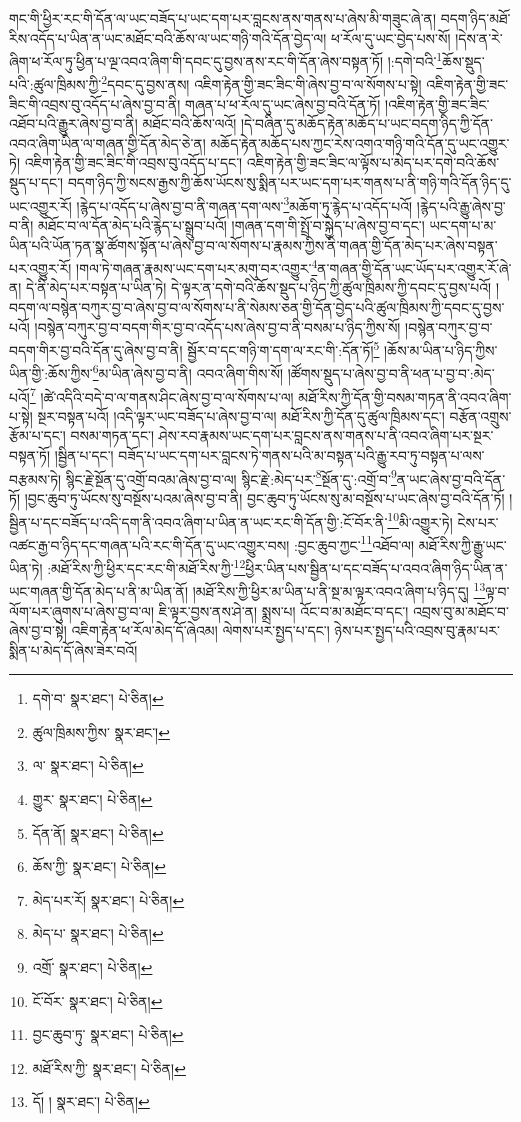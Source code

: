 གང་གི་ཕྱིར་རང་གི་དོན་ལ་ཡང་བཟོད་པ་ཡང་དག་པར་བླངས་ནས་གནས་པ་ཞེས་མི་གཟུང་ཞེ་ན། བདག་ཉིད་མཐོ་རིས་འདོད་པ་ཡིན་ན་ཡང་མཐོང་བའི་ཆོས་ལ་ཡང་གཉི་གའི་དོན་བྱེད་ལ། ཕ་རོལ་དུ་ཡང་བྱེད་པས་སོ། །དེས་ན་རེ་ཞིག་ཕ་རོལ་ཏུ་ཕྱིན་པ་ལྔ་འབའ་ཞིག་གི་དབང་དུ་བྱས་ནས་རང་གི་དོན་ཞེས་བསྟན་ཏོ། །:དགེ་བའི་\footnote{དགེ་བ་  སྣར་ཐང་།  པེ་ཅིན། }ཆོས་སྡུད་པའི་:ཚུལ་ཁྲིམས་ཀྱི་\footnote{ཚུལ་ཁྲིམས་ཀྱིས་  སྣར་ཐང་། }དབང་དུ་བྱས་ནས། འཇིག་རྟེན་གྱི་ཟང་ཟིང་གི་ཞེས་བྱ་བ་ལ་སོགས་པ་སྟེ། འཇིག་རྟེན་གྱི་ཟང་ཟིང་གི་འབྲས་བུ་འདོད་པ་ཞེས་བྱ་བ་ནི། གཞན་པ་ཕ་རོལ་དུ་ཡང་ཞེས་བྱ་བའི་དོན་ཏོ། །འཇིག་རྟེན་གྱི་ཟང་ཟིང་འཐོབ་པའི་རྒྱུར་ཞེས་བྱ་བ་ནི། མཐོང་བའི་ཆོས་ལའོ། །དེ་བཞིན་དུ་མཆོད་རྟེན་མཆོད་པ་ཡང་བདག་ཉིད་ཀྱི་དོན་འབའ་ཞིག་ཡིན་ལ་གཞན་གྱི་དོན་མེད་ཅེ་ན། མཆོད་རྟེན་མཆོད་པས་ཀྱང་རེས་འགའ་གཉི་གའི་དོན་དུ་ཡང་འགྱུར་ཏེ། འཇིག་རྟེན་གྱི་ཟང་ཟིང་གི་འབྲས་བུ་འདོད་པ་དང་། འཇིག་རྟེན་གྱི་ཟང་ཟིང་ལ་ལྟོས་པ་མེད་པར་དགེ་བའི་ཆོས་སྡུད་པ་དང་། བདག་ཉིད་ཀྱི་སངས་རྒྱས་ཀྱི་ཆོས་ཡོངས་སུ་སྨིན་པར་ཡང་དག་པར་གནས་པ་ནི་གཉི་གའི་དོན་ཉིད་དུ་ཡང་འགྱུར་རོ། །རྙེད་པ་འདོད་པ་ཞེས་བྱ་བ་ནི་གཞན་དག་ལས་\footnote{ལ་  སྣར་ཐང་།  པེ་ཅིན། }མཆོག་ཏུ་རྙེད་པ་འདོད་པའོ། །རྙེད་པའི་རྒྱུ་ཞེས་བྱ་བ་ནི། མཐོང་བ་ལ་དོན་མེད་པའི་རྙེད་པ་སྒྲུབ་པའོ། །གཞན་དག་གི་སྤྲོ་བ་སྐྱེད་པ་ཞེས་བྱ་བ་དང་། ཡང་དག་པ་མ་ཡིན་པའི་ཡོན་ཏན་སྣ་ཚོགས་སྟོན་པ་ཞེས་བྱ་བ་ལ་སོགས་པ་རྣམས་ཀྱིས་ནི་གཞན་གྱི་དོན་མེད་པར་ཞེས་བསྟན་པར་འགྱུར་རོ། །གལ་ཏེ་གཞན་རྣམས་ཡང་དག་པར་མགུ་བར་འགྱུར་\footnote{གྱུར་  སྣར་ཐང་།  པེ་ཅིན། }ན་གཞན་གྱི་དོན་ཡང་ཡོད་པར་འགྱུར་རོ་ཞེ་ན། དེ་ནི་མེད་པར་བསྟན་པ་ཡིན་ཏེ། དེ་ལྟར་ན་དགེ་བའི་ཆོས་སྡུད་པ་ཉིད་ཀྱི་ཚུལ་ཁྲིམས་ཀྱི་དབང་དུ་བྱས་པའོ། །བདག་ལ་བསྙེན་བཀུར་བྱ་བ་ཞེས་བྱ་བ་ལ་སོགས་པ་ནི་སེམས་ཅན་གྱི་དོན་བྱེད་པའི་ཚུལ་ཁྲིམས་ཀྱི་དབང་དུ་བྱས་པའོ། །བསྙེན་བཀུར་བྱ་བ་བདག་གིར་བྱ་བ་འདོད་པས་ཞེས་བྱ་བ་ནི་བསམ་པ་ཉིད་ཀྱིས་སོ། །བསྙེན་བཀུར་བྱ་བ་བདག་གིར་བྱ་བའི་དོན་དུ་ཞེས་བྱ་བ་ནི། སྦྱོར་བ་དང་གཉི་ག་དག་ལ་རང་གི་:དོན་ཏོ།\footnote{དོན་ནོ།  སྣར་ཐང་།  པེ་ཅིན། } །ཆོས་མ་ཡིན་པ་ཉིད་ཀྱིས་ཡིན་གྱི་:ཆོས་ཀྱིས་\footnote{ཆོས་ཀྱི་  སྣར་ཐང་།  པེ་ཅིན། }མ་ཡིན་ཞེས་བྱ་བ་ནི། འབའ་ཞིག་གིས་སོ། །ཚོགས་སྡུད་པ་ཞེས་བྱ་བ་ནི་ཕན་པ་བྱ་བ་:མེད་པའོ།\footnote{མེད་པར་རོ།  སྣར་ཐང་།  པེ་ཅིན། } །ཚེ་འདིའི་བདེ་བ་ལ་གནས་ཤིང་ཞེས་བྱ་བ་ལ་སོགས་པ་ལ། མཐོ་རིས་ཀྱི་དོན་གྱི་བསམ་གཏན་ནི་འབའ་ཞིག་པ་སྟེ། སྔར་བསྟན་པའོ། །འདི་ལྟར་ཡང་བཟོད་པ་ཞེས་བྱ་བ་ལ། མཐོ་རིས་ཀྱི་དོན་དུ་ཚུལ་ཁྲིམས་དང་། བརྩོན་འགྲུས་རྩོམ་པ་དང་། བསམ་གཏན་དང་། ཤེས་རབ་རྣམས་ཡང་དག་པར་བླངས་ནས་གནས་པ་ནི་འབའ་ཞིག་པར་སྔར་བསྟན་ཏོ། །སྦྱིན་པ་དང་། བཟོད་པ་ཡང་དག་པར་བླངས་ཏེ་གནས་པའི་མ་བསྟན་པའི་རྒྱུ་རབ་ཏུ་བསྟན་པ་ལས་བརྩམས་ཏེ། སྙིང་རྗེ་སྔོན་དུ་འགྲོ་བའམ་ཞེས་བྱ་བ་ལ། སྙིང་རྗེ་:མེད་པར་\footnote{མེད་པ་  སྣར་ཐང་།  པེ་ཅིན། }སྔོན་དུ་:འགྲོ་བ་\footnote{འགྲོ་  སྣར་ཐང་།  པེ་ཅིན། }ན་ཡང་ཞེས་བྱ་བའི་དོན་ཏོ། །བྱང་ཆུབ་ཏུ་ཡོངས་སུ་བསྔོས་པའམ་ཞེས་བྱ་བ་ནི། བྱང་ཆུབ་ཏུ་ཡོངས་སུ་མ་བསྔོས་པ་ཡང་ཞེས་བྱ་བའི་དོན་ཏོ། །སྦྱིན་པ་དང་བཟོད་པ་འདི་དག་ནི་འབའ་ཞིག་པ་ཡིན་ན་ཡང་རང་གི་དོན་གྱི་:ངོ་བོར་ནི་\footnote{ངོ་བོར་  སྣར་ཐང་།  པེ་ཅིན། }མི་འགྱུར་ཏེ། ངེས་པར་འཚང་རྒྱ་བ་ཉིད་དང་གཞན་པའི་རང་གི་དོན་དུ་ཡང་འགྱུར་བས། :བྱང་ཆུབ་ཀྱང་\footnote{བྱང་ཆུབ་ཏུ་  སྣར་ཐང་།  པེ་ཅིན། }འཐོབ་ལ། མཐོ་རིས་ཀྱི་རྒྱུ་ཡང་ཡིན་ཏེ། :མཐོ་རིས་ཀྱི་ཕྱིར་དང་རང་གི་མཐོ་རིས་ཀྱི་\footnote{མཐོ་རིས་ཀྱི་  སྣར་ཐང་།  པེ་ཅིན། }ཕྱིར་ཡིན་པས་སྦྱིན་པ་དང་བཟོད་པ་འབའ་ཞིག་ཉིད་ཡིན་ན་ཡང་གཞན་གྱི་དོན་མེད་པ་ནི་མ་ཡིན་ནོ། །མཐོ་རིས་ཀྱི་ཕྱིར་མ་ཡིན་པ་ནི་སྔ་མ་ལྟར་འབའ་ཞིག་པ་ཉིད་དུ། \footnote{དོ། །   སྣར་ཐང་།  པེ་ཅིན། }ལྟ་བ་ལོག་པར་ཞུགས་པ་ཞེས་བྱ་བ་ལ། ཇི་ལྟར་བྱས་ནས་ཤེ་ན། སྨྲས་པ། འོང་བ་མ་མཐོང་བ་དང་། འབྲས་བུ་མ་མཐོང་བ་ཞེས་བྱ་བ་སྟེ། འཇིག་རྟེན་ཕ་རོལ་མེད་དོ་ཞེའམ། ལེགས་པར་སྤྱད་པ་དང་། ཉེས་པར་སྤྱད་པའི་འབྲས་བུ་རྣམ་པར་སྨིན་པ་མེད་དོ་ཞེས་ཟེར་བའོ། 